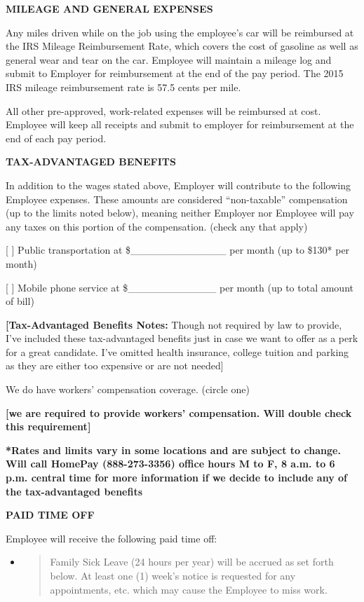 \documentclass[]{article}
\begin{document}
\textbf{MILEAGE AND GENERAL EXPENSES}

Any miles driven while on the job using the employee's car will be
reimbursed at the IRS Mileage Reimbursement Rate, which covers the cost
of gasoline as well as general wear and tear on the car. Employee will
maintain a mileage log and submit to Employer for reimbursement at the
end of the pay period. The 2015 IRS mileage reimbursement rate is 57.5
cents per mile.

All other pre-approved, work-related expenses will be reimbursed at
cost. Employee will keep all receipts and submit to employer for
reimbursement at the end of each pay period.

\textbf{TAX-ADVANTAGED BENEFITS}

In addition to the wages stated above, Employer will contribute to the
following Employee expenses. These amounts are considered
``non-taxable'' compensation (up to the limits noted below), meaning
neither Employer nor Employee will pay any taxes on this portion of the
compensation. (check any that apply)

[ ] Public transportation at \$\_\_\_\_\_\_\_\_\_\_\_\_\_ per month (up to
\$130* per month)

[ ] Mobile phone service at \$\_\_\_\_\_\_\_\_\_\_\_\_ per month (up to
total amount of bill)

\textbf{{[}Tax-Advantaged Benefits Notes:} Though not required by law to
provide, I've included these tax-advantaged benefits just in case we
want to offer as a perk for a great candidate. I've omitted health
insurance, college tuition and parking as they are either too expensive
or are not needed{]}

We do have workers' compensation coverage. (circle one)

\textbf{{[}we are required to provide workers' compensation. Will double
check this requirement{]}}

\textbf{*Rates and limits vary in some locations and are subject to
change. Will call HomePay (888-273-3356) office hours M to F, 8 a.m. to
6 p.m. central time for more information if we decide to include any of
the tax-advantaged benefits}

\textbf{PAID TIME OFF}

Employee will receive the following paid time off:

\begin{itemize}
\item
  \begin{quote}
  Family Sick Leave (24 hours per year) will be accrued as set forth
  below. At least one (1) week's notice is requested for any
  appointments, etc. which may cause the Employee to miss work.
  \end{quote}
\end{itemize}
\end{document}
